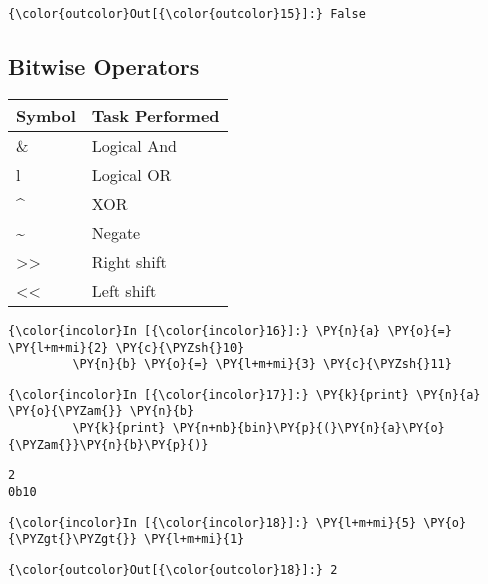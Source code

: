             \begin{Verbatim}[commandchars=\\\{\}]
{\color{outcolor}Out[{\color{outcolor}15}]:} False
\end{Verbatim}
        
    \subsection{Bitwise Operators}\label{bitwise-operators}

    \begin{longtable}[c]{@{}ll@{}}
\toprule
Symbol & Task Performed\tabularnewline
\midrule
\endhead
\& & Logical And\tabularnewline
l & Logical OR\tabularnewline
\^{} & XOR\tabularnewline
\textasciitilde{} & Negate\tabularnewline
\textgreater{}\textgreater{} & Right shift\tabularnewline
\textless{}\textless{} & Left shift\tabularnewline
\bottomrule
\end{longtable}

    \begin{Verbatim}[commandchars=\\\{\}]
{\color{incolor}In [{\color{incolor}16}]:} \PY{n}{a} \PY{o}{=} \PY{l+m+mi}{2} \PY{c}{\PYZsh{}10}
         \PY{n}{b} \PY{o}{=} \PY{l+m+mi}{3} \PY{c}{\PYZsh{}11}
\end{Verbatim}

    \begin{Verbatim}[commandchars=\\\{\}]
{\color{incolor}In [{\color{incolor}17}]:} \PY{k}{print} \PY{n}{a} \PY{o}{\PYZam{}} \PY{n}{b}
         \PY{k}{print} \PY{n+nb}{bin}\PY{p}{(}\PY{n}{a}\PY{o}{\PYZam{}}\PY{n}{b}\PY{p}{)}
\end{Verbatim}

    \begin{Verbatim}[commandchars=\\\{\}]
2
0b10
    \end{Verbatim}

    \begin{Verbatim}[commandchars=\\\{\}]
{\color{incolor}In [{\color{incolor}18}]:} \PY{l+m+mi}{5} \PY{o}{\PYZgt{}\PYZgt{}} \PY{l+m+mi}{1}
\end{Verbatim}

            \begin{Verbatim}[commandchars=\\\{\}]
{\color{outcolor}Out[{\color{outcolor}18}]:} 2
\end{Verbatim}
        
